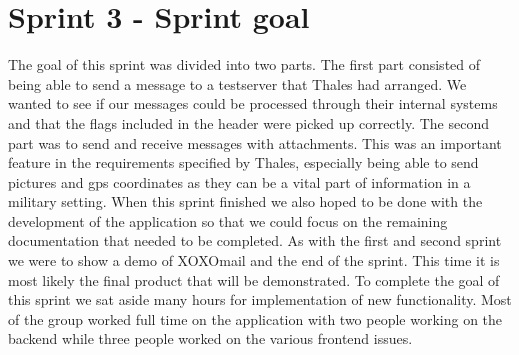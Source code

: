 \section{Sprint 3 - Sprint goal}
The goal of this sprint was divided into two parts. The first part consisted of being able to send a message to a testserver that Thales had arranged. We wanted to see if our messages could be processed through their internal systems and that the flags included in the header were picked up correctly. The second part was to send and receive messages with attachments. This was an important feature in the requirements specified by Thales, especially being able to send pictures and gps coordinates as they can be a vital part of information in a military setting.
\newline
\newline
When this sprint finished we also hoped to be done with the development of the application so that we could focus on the remaining documentation that needed to be completed. As with the first and second sprint we were to show a demo of XOXOmail and the end of the sprint. This time it is most likely the final product that will be demonstrated.
\newline
\newline
To complete the goal of this sprint we sat aside many hours for implementation of new functionality. Most of the group worked full time on the application with two people working on the backend while three people worked on the various frontend issues.